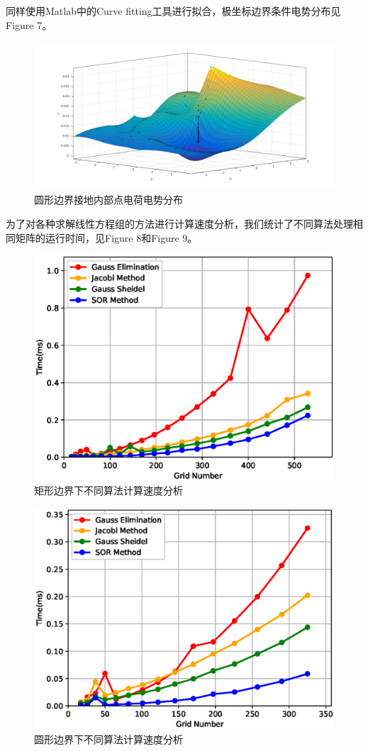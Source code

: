 \documentclass[twoside,twocolumn]{article}
\begin{document}
\begin{CJK*}{UTF8}{gkai}
	同样使用Matlab中的Curve fitting工具进行拟合，极坐标边界条件电势分布见Figure 7。
	\begin{figure}[h]
		\centering
		\includegraphics[width=1.0\linewidth]{figure/figure7}
		\caption{圆形边界接地内部点电荷电势分布}
		\label{fig:figure7}
	\end{figure}	
	\onecolumn
	为了对各种求解线性方程组的方法进行计算速度分析，我们统计了不同算法处理相同矩阵的运行时间，见Figure 8和Figure 9。
	\begin{figure}[h]
	\centering
	\includegraphics[width=0.6\linewidth]{figure/timeR}
	\caption{矩形边界下不同算法计算速度分析}
	\label{fig:timeR}
	\end{figure}	
	\begin{figure}[h]
		\centering
		\includegraphics[width=0.6\linewidth]{figure/timeC}
		\caption{圆形边界下不同算法计算速度分析}
		\label{fig:timeC}
	\end{figure}	
	

\end{CJK*}
\end{document}
